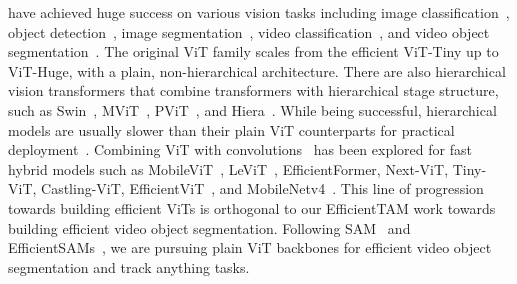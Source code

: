  have achieved huge success on various vision tasks including image classification~\citep{dosovitskiy2020image}, object detection~\citep{li2022exploring}, image segmentation~\cite{cheng2022masked,kirillov2023segment}, video classification~\citep{fan2021multiscale}, and video object segmentation~\citep{duke2021sstvos,yang2023track}. The original ViT family scales from the efficient ViT-Tiny up to ViT-Huge, with a plain, non-hierarchical architecture. There are also hierarchical vision transformers that combine transformers with hierarchical stage structure, such as Swin~\citep{liu2021swin}, MViT~\citep{fan2021multiscale,li2022mvitv2}, PViT~\citep{wang2021pyramid}, and Hiera~\citep{ryali2023hiera}. While being successful, hierarchical models are usually slower than their plain ViT counterparts for practical deployment~\citep{ryali2023hiera}. 
Combining ViT with convolutions~\citep{lecun1989backpropagation} has been explored for fast hybrid models such as MobileViT~\citep{mehta2021mobilevit}, LeViT~\citep{graham2021levit},  EfficientFormer\citep{li2022efficientformer}, Next-ViT\citep{li2022next}, Tiny-ViT\citep{wu2022tinyvit}, Castling-ViT\citep{you2023castling}, EfficientViT~\citep{liu2023efficientvit}, and MobileNetv4~\citep{qin2024mobilenetv4}. This line of progression towards building efficient ViTs is orthogonal to our
EfficientTAM work towards building efficient video object segmentation. Following SAM~\citep{kirillov2023segment} and EfficientSAMs~\citep{xiong2024efficientsam}, we are pursuing plain ViT backbones for efficient video object segmentation and track anything tasks.  


